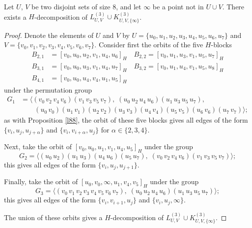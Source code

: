 \begin{subappendices}
\begin{example} \label{eg:H_43-l88-k881}
Let $U$, $V$ be two disjoint sets of size 8, and let $\infty$ be a point not in
$U \cup V$. There exists a $H$-decomposition of $L_{U,V}^{(3)} \cup
K_{U,V,\{\infty\}}^{(3)}$.
\end{example}

\begin{proof}
Denote the elements of $U$ and $V$ by $U = \{u_0, u_1, u_2, u_3, u_4, u_5, u_6,
u_7\}$ and $V = \{v_0, v_1, v_2, v_3, v_4, v_5, v_6, v_7\}$. Consider first the orbits of the five $H$-blocks
\begin{align*}
    B_{2,1} &= [v_0, u_0, u_2, v_1, u_4, u_6]_H \quad
    B_{2,2} = [v_0, u_1, u_3, v_1, u_5, u_7]_H \\
    B_{3,1} &= [v_0, u_0, u_3, v_1, u_4, u_7]_H \quad
    B_{3,2} = [v_0, u_1, u_4, v_1, u_5, u_8]_H \\
    B_{4,1} &= [v_0, u_0, u_4, v_4, u_1, u_5]_H
\end{align*}
under the permutation group
\begin{align*}
    G_1 &= \langle (v_0 \, v_2 \, v_4 \, v_6) (v_1 \, v_3 \, v_5 \, v_7),
    \; (u_0 \, u_2 \, u_4 \, u_6) (u_1 \, u_3 \, u_5 \, u_7), \\
    & \quad \quad (u_0 \, v_0) (u_1 \, v_1) (u_2 \, v_2) (u_3 \, v_3) (u_4 \, v_4)
    (u_5 \, v_5) (u_6 \, v_6) (u_7 \, v_7) \rangle;
\end{align*}
as with Proposition \ref{l88}, the orbit of these five blocks gives all edges of the form $\{v_i, u_j, u_{j+\alpha}\}$ and $\{v_i, v_{i+\alpha}, u_j\}$ for $\alpha \in \{2,3,4\}$.

Next, take the orbit of $[v_0, u_0, u_1, v_1, u_4, u_5]_H$ under the group
\[
    G_2 = \langle (u_0 \, u_2) (u_1 \, u_3) (u_4 \, u_6) (u_5 \, u_7), \;
    (v_0 \, v_2 \, v_4 \, v_6) (v_1 \, v_3 \, v_5 \, v_7)\rangle;
\]
this gives all edges of the form $\{v_i, u_j, u_{j+1}\}$.

Finally, take the orbit of $[u_0, v_0, \infty, u_1, v_4, v_5]_H$ under the group
\[
    G_3 = \langle (v_0 \, v_1 \, v_2 \, v_3 \, v_4 \, v_5 \, v_6 \, v_7), \;
    (u_0 \, u_2 \, u_4 \, u_6) (u_1 \, u_3 \, u_5 \, u_7)\rangle;
\]
this gives all edges of the form $\{v_i, v_{i+1}, u_j\}$ and $\{v_i, u_j, \infty\}$.

The union of these orbits gives a $H$-decomposition of $L_{U,V}^{(3)}
\cup K_{U,V,\{\infty\}}^{(3)}$.
\end{proof}

\end{subappendices}